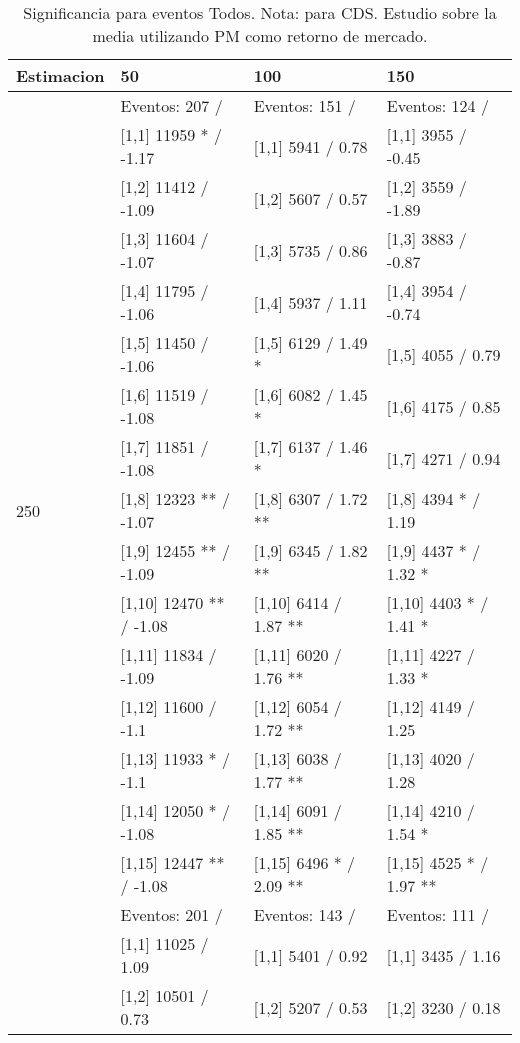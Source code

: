 \begin{table}

\caption{Significancia para eventos Todos. Nota: para CDS. Estudio sobre la media utilizando PM como retorno de mercado.}
\centering
\begin{tabular}[t]{llll}
\toprule
Estimacion & 50 & 100 & 150\\
\midrule
 & Eventos:  207 / & Eventos:  151 / & Eventos:  124 /\\
 & {}[1,1] 11959 * / -1.17 & {}[1,1] 5941  / 0.78 & {}[1,1] 3955  / -0.45\\
 & {}[1,2] 11412  / -1.09 & {}[1,2] 5607  / 0.57 & {}[1,2] 3559  / -1.89\\
 & {}[1,3] 11604  / -1.07 & {}[1,3] 5735  / 0.86 & {}[1,3] 3883  / -0.87\\
 & {}[1,4] 11795  / -1.06 & {}[1,4] 5937  / 1.11 & {}[1,4] 3954  / -0.74\\
\addlinespace
 & {}[1,5] 11450  / -1.06 & {}[1,5] 6129  / 1.49 * & {}[1,5] 4055  / 0.79\\
 & {}[1,6] 11519  / -1.08 & {}[1,6] 6082  / 1.45 * & {}[1,6] 4175  / 0.85\\
 & {}[1,7] 11851  / -1.08 & {}[1,7] 6137  / 1.46 * & {}[1,7] 4271  / 0.94\\
250 & {}[1,8] 12323 ** / -1.07 & {}[1,8] 6307  / 1.72 ** & {}[1,8] 4394 * / 1.19\\
 & {}[1,9] 12455 ** / -1.09 & {}[1,9] 6345  / 1.82 ** & {}[1,9] 4437 * / 1.32 *\\
\addlinespace
 & {}[1,10] 12470 ** / -1.08 & {}[1,10] 6414  / 1.87 ** & {}[1,10] 4403 * / 1.41 *\\
 & {}[1,11] 11834  / -1.09 & {}[1,11] 6020  / 1.76 ** & {}[1,11] 4227  / 1.33 *\\
 & {}[1,12] 11600  / -1.1 & {}[1,12] 6054  / 1.72 ** & {}[1,12] 4149  / 1.25\\
 & {}[1,13] 11933 * / -1.1 & {}[1,13] 6038  / 1.77 ** & {}[1,13] 4020  / 1.28\\
 & {}[1,14] 12050 * / -1.08 & {}[1,14] 6091  / 1.85 ** & {}[1,14] 4210  / 1.54 *\\
\addlinespace
 & {}[1,15] 12447 ** / -1.08 & {}[1,15] 6496 * / 2.09 ** & {}[1,15] 4525 * / 1.97 **\\
 & Eventos:  201 / & Eventos:  143 / & Eventos:  111 /\\
 & {}[1,1] 11025  / 1.09 & {}[1,1] 5401  / 0.92 & {}[1,1] 3435  / 1.16\\
 & {}[1,2] 10501  / 0.73 & {}[1,2] 5207  / 0.53 & {}[1,2] 3230  / 0.18\\

\end{tabular}
\end{table}
